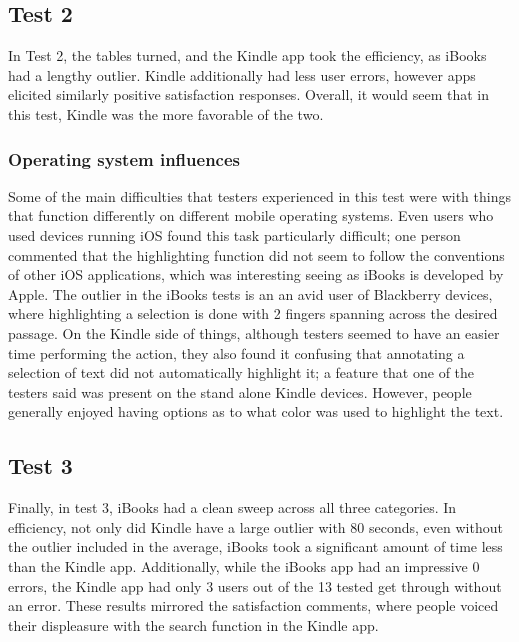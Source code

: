 \documentclass[11pt, oneside]{article}
\begin{document}
\subsection{Test 2}
In Test 2, the tables turned, and the Kindle app took the efficiency, as iBooks had a lengthy outlier. Kindle additionally had less user errors, however apps elicited similarly positive satisfaction responses. Overall, it would seem that in this test, Kindle was the more favorable of the two.
\subsubsection{Operating system influences}
Some of the main difficulties that testers experienced in this test were with things that function differently on different mobile operating systems. Even users who used devices running iOS found this task particularly difficult; one person commented that the highlighting function did not seem to follow the conventions of other iOS applications, which was interesting seeing as iBooks is developed by Apple. The outlier in the iBooks tests is an an avid user of Blackberry devices, where highlighting a selection is done with 2 fingers spanning across the desired passage. On the Kindle side of things, although testers seemed to have an easier time performing the action, they also found it confusing that annotating a selection of text did not automatically highlight it; a feature that one of the testers said was present on the stand alone Kindle devices. However, people generally enjoyed having options as to what color was used to highlight the text.

\subsection{Test 3}
Finally, in test 3, iBooks had a clean sweep across all three categories. In efficiency, not only did Kindle have a large outlier with 80 seconds, even without the outlier included in the average, iBooks took a significant amount of time less than the Kindle app. Additionally, while the iBooks app had an impressive 0 errors, the Kindle app had only 3 users out of the 13 tested get through without an error. These results mirrored the satisfaction comments, where people voiced their displeasure with the search function in the Kindle app.
\end{document}
